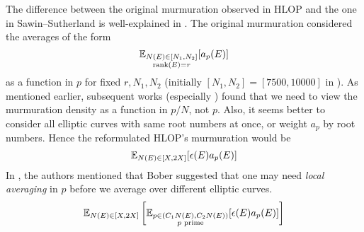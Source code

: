 The difference between the original murmuration observed in HLOP \cite{he2024murmurations} and the one in Sawin--Sutherland is well-explained in \cite[Section 1.1]{sawin2025murmurations}.
The original murmuration considered the averages of the form 
\[
\mathbb{E}_{\substack{N(E) \in [N_1, N_2] \\ \mathrm{rank}(E) = r}} [a_p(E)]
\]
as a function in $p$ for fixed $r, N_1, N_2$ (initially $[N_1, N_2] = [7500, 10000]$ in \cite{he2024murmurations}).
As mentioned earlier, subsequent works (especially \cite{sutherlandletter}) found that we need to view the murmuration density as a function in $p / N$, not $p$.
Also, it seems better to consider all elliptic curves with same root numbers at once, or weight $a_p$ by root numbers.
Hence the reformulated HLOP's murmuration would be
\begin{equation*}
    \mathbb{E}_{\substack{N(E) \in [X, 2X]}} [\epsilon(E) a_p(E)]
\end{equation*}
In \cite{sawin2025murmurations}, the authors mentioned that Bober suggested that one may need \emph{local averaging} in $p$ before we average over different elliptic curves.
\begin{equation*}
    \mathbb{E}_{N(E) \in [X, 2X]} \left[\mathbb{E}_{\substack{p \in (C_1 N(E), C_2 N(E)) \\ p \text{ prime}}} [\epsilon(E) a_p(E)]\right]
\end{equation*}




